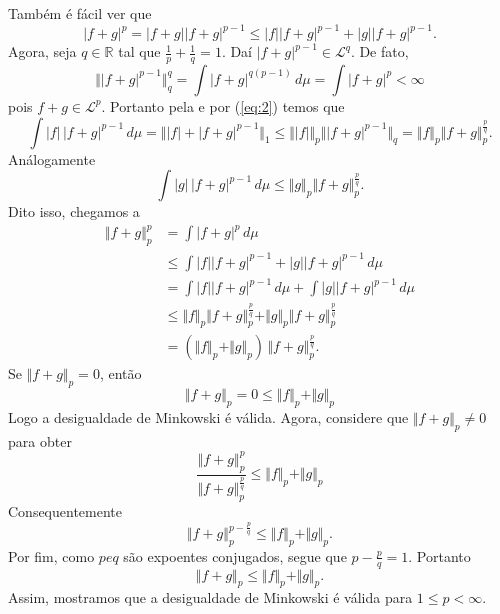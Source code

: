 \documentclass[a4paper, 11pt]{book}
\theoremstyle{definition}
\newcommand{\bR}{\mathbb{R}}
\newcommand{\cL}{\mathcal{L}}
\begin{document}
\begin{prf}
    Também é fácil ver que
    \[
        |f+g|^p = |f + g| |f + g|^{p-1} \leqslant |f| |f + g|^{p-1} + |g| |f + g|^{p-1}.
    \]
    Agora, seja $q \in \bR$ tal que $\frac{1}{p} + \frac{1}{q} = 1$.
    Daí $|f + g|^{p-1} \in \cL^q$. De fato,
    \begin{equation} \label{eq:2}
        \Vert |f+g|^{p-1} \Vert_q^q = \int |f + g|^{q(p-1)} \,d\mu = \int |f + g|^p < \infty
    \end{equation}
    pois $f + g \in \cL^p$.
    Portanto pela  e por (\ref{eq:2}) temos que
    \begin{equation} \label{eq:ffg}
        \int |f| \, |f + g|^{p-1} \, d\mu = \Vert |f| + |f+g|^{p-1} \Vert_1 \leqslant \Vert |f| \Vert_p \Vert |f + g|^{p-1} \Vert_q = \Vert f \Vert_p \Vert f + g \Vert_p^{\frac{p}{q}}.
    \end{equation}
    Análogamente
    \begin{equation} \label{eq:gfg}
        \int |g| \, |f + g|^{p-1} \,d\mu \leqslant \Vert g \Vert_p \Vert f + g \Vert_p^{\frac{p}{q}}.
    \end{equation}
    Dito isso, chegamos a
    \[
        \begin{aligned}
            \Vert f + g \Vert_p^p &= \int |f + g|^{p} \,d\mu\\
            &\leqslant \int |f| |f + g|^{p-1} + |g| |f + g|^{p-1} \,d\mu\\
            &= \int |f| |f + g|^{p-1} \,d\mu + \int |g| |f + g|^{p-1} \,d\mu\\
            &\leqslant \Vert f \Vert_p \Vert f + g \Vert_p^\frac{p}{q} + \Vert g \Vert_p \Vert f + g \Vert_p^\frac{p}{q}\\
            &= ( \Vert f \Vert_p + \Vert g \Vert_p) \, \Vert f + g \Vert_p^{\frac{p}{q}}.
        \end{aligned}
    \]
    Se $\Vert f + g \Vert_p = 0$, então
    \[
        \Vert f + g \Vert_p = 0 \leqslant \Vert f \Vert_p + \Vert g \Vert_p
    \]
    Logo a desigualdade de Minkowski é válida.
    Agora, considere que $\Vert f + g \Vert_p \neq 0$ para obter
    \[
        \frac{\Vert f + g \Vert_p^p}{\Vert f + g \Vert_p^{\frac{p}{q}}} \leqslant \Vert f \Vert_p + \Vert g \Vert_p
    \]
    Consequentemente
    \[
        \Vert f + g \Vert_p^{p - \frac{p}{q}} \leqslant \Vert f \Vert_p + \Vert g \Vert_p.
    \]
    Por fim, como $p e q$ são expoentes conjugados, segue que $p - \frac{p}{q} = 1$.
    Portanto
    \[
        \Vert f + g \Vert_p \leqslant \Vert f \Vert_p + \Vert g \Vert_p.
    \]
    Assim, mostramos que a desigualdade de Minkowski é válida para $1 \leqslant p < \infty$.
\end{prf}
\end{document}
